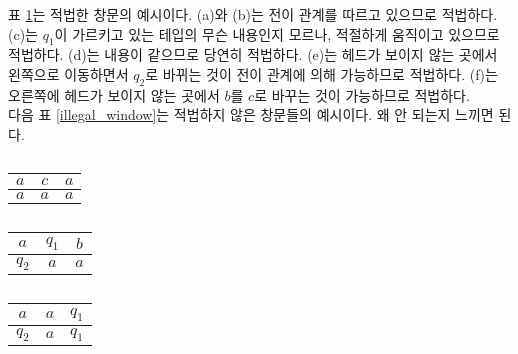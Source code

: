 \documentclass[b5paper]{book}
\theoremstyle{definition}
\newenvironment{pf*}{\pushQED{\qed}\pf}{\popQED\endpf}
\begin{document}
\begin{pf*}
\begin{table}[!ht]
\begin{subtable}[h]{0.3\textwidth}
\begin{tabular}{ | c | c | c|}
            \hline
           \end{tabular}
           \caption{}
        \end{subtable}
         \caption{}
         \label{legal_window}
    \end{table}
    표 \ref{legal_window}는 적법한 창문의 예시이다. (a)와 (b)는 전이 관계를 따르고 있으므로 적법하다.
    (c)는 $q_1$이 가르키고 있는 테입의 무슨 내용인지 모르나, 적절하게 움직이고 있으므로 적법하다. 
    (d)는 내용이 같으므로 당연히 적법하다. (e)는 헤드가 보이지 않는 곳에서 왼쪽으로 이동하면서 $q_2$로 바뀌는 것이
    전이 관계에 의해 가능하므로 적법하다. (f)는 오른쪽에 헤드가 보이지 않는 곳에서 $b$를 $c$로 바꾸는 것이 가능하므로
    적법하다. \\ 
    다음 표 \ref{illegal_window}는 적법하지 않은 창문들의 예시이다. 왜 안 되는지 느끼면 된다. \\ 
    \begin{table}[!ht]
        \begin{subtable}[h]{0.3\textwidth}
            \centering
            \begin{tabular}{ | c | c | c|}
            \hline 
            $a$ & $c$ & $a$ \\ 
            \hline 
            $a$ & $a$ & $a$ \\ 
            \hline
           \end{tabular}
           \caption{}
        \end{subtable}
        \hfill
        \begin{subtable}[h]{0.3\textwidth}
            \centering
            \begin{tabular}{ | c | c | c|}
            \hline 
            $a$ & $q_1$ & $b$ \\ 
            \hline 
            $q_2$ & $a$ & $a$ \\ 
            \hline
           \end{tabular}
           \caption{}
        \end{subtable}
        \hfill
        \begin{subtable}[h]{0.3\textwidth}
            \centering
            \begin{tabular}{ | c | c | c|}
            \hline 
            $a$ & $a$ & $q_1$ \\ 
            \hline 
            $q_2$ & $a$ & $q_1$ \\ 
            \hline
           \end{tabular}
           \caption{}
        \end{subtable}

\end{table}
\end{pf*}
\end{document}
